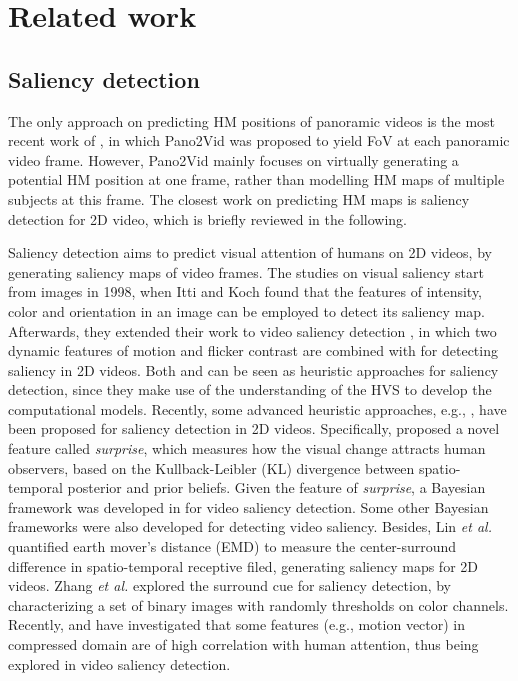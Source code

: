 \documentclass[10pt,journal,compsoc]{IEEEtran}
\begin{document}
\section{Related work}

\subsection{Saliency detection}
The only approach on predicting HM positions of panoramic videos is the most recent work of \cite{su2016pano2vid}, in which Pano2Vid was proposed to yield FoV at each panoramic video frame. However, Pano2Vid mainly focuses on virtually generating a potential HM position at one frame, rather than modelling HM maps of multiple subjects at this frame. The closest work on predicting HM maps is saliency detection for 2D video, which is briefly reviewed in the following.

Saliency detection aims to predict visual attention of humans on 2D videos, by generating saliency maps of video frames. The studies on visual saliency start from images in 1998, when Itti and Koch \cite{itti1998model} found that the features of intensity, color and orientation in an image can be employed to detect its saliency map. Afterwards, they extended their work to video saliency detection \cite{itti2004automatic}, in which two dynamic features of motion and flicker contrast are combined with \cite{itti1998model} for detecting saliency in 2D videos. Both \cite{itti1998model} and \cite{itti2004automatic} can be seen as heuristic approaches for saliency detection, since they make use of the understanding of the HVS to develop the computational models. Recently, some advanced heuristic approaches, e.g.,  \cite{itti2009bayesian, boccignone2008nonparametric, zhang2009sunday, guo2010novel, ren2013regularized, lin2013visual, zhang2016exploiting, hossein2015many, xu2017learning}, have been proposed for saliency detection in 2D videos. Specifically, \cite{itti2009bayesian} proposed a novel feature called \textit{surprise}, which measures how the visual change attracts human observers, based on the Kullback-Leibler (KL) divergence between spatio-temporal posterior and prior beliefs. Given the feature of \textit{surprise}, a Bayesian framework was developed in \cite{itti2009bayesian} for video saliency detection.  Some other Bayesian frameworks \cite{boccignone2008nonparametric, zhang2009sunday}  were also developed for detecting video saliency. Besides, Lin \textit{et al.} \cite{lin2013visual} quantified earth mover's distance (EMD) to measure the center-surround difference in spatio-temporal receptive filed, generating saliency maps for 2D videos. Zhang \textit{et al.} \cite{zhang2016exploiting} explored the surround cue for saliency detection, by characterizing a set of binary images with randomly thresholds on color channels. Recently, \cite{hossein2015many} and \cite{xu2017learning} have investigated that some features (e.g., motion vector) in compressed domain are of high correlation with human attention, thus being explored in video saliency detection.
\end{document}
